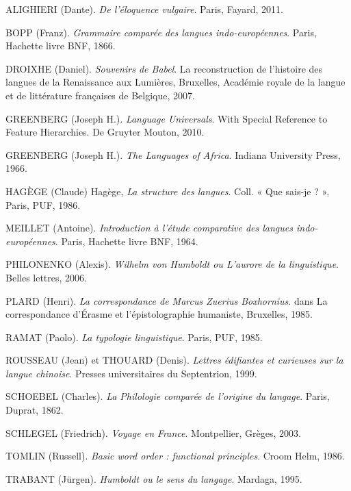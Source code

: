 \begin{small}
\setlength{\parindent}{0pt}
\setlength{\parskip}{.55em}
ALIGHIERI (Dante). \textit{De l’éloquence vulgaire}. Paris, Fayard, 2011.

BOPP (Franz). \textit{Grammaire comparée des langues indo-européennes}. Paris, Hachette livre BNF, 1866.

DROIXHE (Daniel). \textit{Souvenirs de Babel}. La reconstruction de l’histoire des langues de la Renaissance aux Lumières, Bruxelles, Académie royale de la langue et de littérature françaises de Belgique, 2007.

GREENBERG (Joseph H.). \textit{Language Universals}. With Special Reference to Feature Hierarchies. De Gruyter Mouton, 2010.

GREENBERG (Joseph H.). \textit{The Languages of Africa}. Indiana University Press, 1966.

HAGÈGE (Claude) Hagège, \textit{La structure des langues}. Coll. « Que sais-je ? », Paris, PUF, 1986.

MEILLET (Antoine). \textit{Introduction à l’étude comparative des langues indo-européennes}. Paris, Hachette livre BNF, 1964.

PHILONENKO (Alexis). \textit{Wilhelm von Humboldt ou L’aurore de la linguistique}. Belles lettres, 2006.

PLARD (Henri). \textit{La correspondance de Marcus Zuerius Boxhornius}. dans La correspondance d’Érasme et l’épistolographie humaniste, Bruxelles, 1985.

RAMAT (Paolo). \textit{La typologie linguistique}. Paris, PUF, 1985.

ROUSSEAU (Jean) et THOUARD (Denis). \textit{Lettres édifiantes et curieuses sur la langue chinoise}. Presses universitaires du Septentrion, 1999.

SCHOEBEL (Charles). \textit{La Philologie comparée de l’origine du langage}. Paris, Duprat, 1862.

SCHLEGEL (Friedrich). \textit{Voyage en France}. Montpellier, Grèges, 2003.

TOMLIN (Russell). \textit{Basic word order : functional principles}. Croom Helm, 1986.

TRABANT (Jürgen). \textit{Humboldt ou le sens du langage}. Mardaga, 1995.
\end{small}


